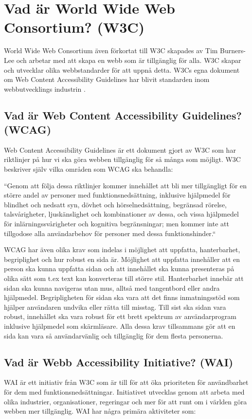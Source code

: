 \documentclass[11p]{article}
\begin{document}
    \section{Vad är World Wide Web Consortium? (W3C)}
    World Wide Web Consortium även förkortat till W3C skapades av Tim Burners-Lee och arbetar med att skapa en webb som är tillgänglig för alla.
    W3C skapar och utvecklar olika webbstandarder för att uppnå detta.
    W3Cs egna dokument om Web Content Accessibility Guidelines har blivit standarden inom webbutvecklings industrin \textcite{W3C}.

    \subsection{Vad är Web Content Accessibility Guidelines? (WCAG)}
    Web Content Accessibility Guidelines är ett dokument gjort av W3C som har riktlinjer på hur vi ska göra webben tillgänglig för så många som möjligt.
    W3C beskriver själv vilka områden som WCAG ska behandla:

    ``Genom att följa dessa riktlinjer kommer innehållet att bli mer tillgängligt för en större andel av personer med funktionsnedsättning, inklusive hjälpmedel för blindhet och nedsatt syn, dövhet och hörselnedsättning, begränsad rörelse, talsvårigheter, ljuskänslighet och kombinationer av dessa, och vissa hjälpmedel för inlärningssvårigheter och kognitiva begränsningar; men kommer inte att tillgodose alla användarbehov för personer med dessa funktionshinder.`` \textcite{WCAG}

    WCAG har även olika krav som indelas i möjlighet att uppfatta, hanterbarhet, begriplighet och hur robust en sida är.
    Möjlighet att uppfatta innehåller att en person ska kunna uppfatta sidan och att innehållet ska kunna presenteras på olika sätt som t.ex text kan konverteras till större stil.
    Hanterbarhet innebär att sidan ska kunna navigeras utan mus, alltså med tangentbord eller andra hjälpmedel.
    Begripligheten för sidan ska vara att det finns inmatningsstöd som hjälper användaren undvika eller rätta till misstag.
    Till sist ska sidan vara robust, innehållet ska vara robust för ett brett spektrum av användarprogram inklusive hjälpmedel som skärmläsare.
    Alla dessa krav tillsammans gör att en sida kan vara så användarvänlig och tillgänglig för dem flesta personerna. \textcite{Digg_2023}

    \subsection{Vad är Webb Accessibility Initiative? (WAI)}
    WAI är ett initiativ från W3C som är till för att öka prioriteten för användbarhet för dem med funktionsnedsättningar.
    Initiativet utvecklas genom att arbeta med olika industrier, organisationer, regeringar och mer för att runt om i världen göra webben mer tillgänglig.
    WAI har några primära aktiviteter som:
\end{document}
